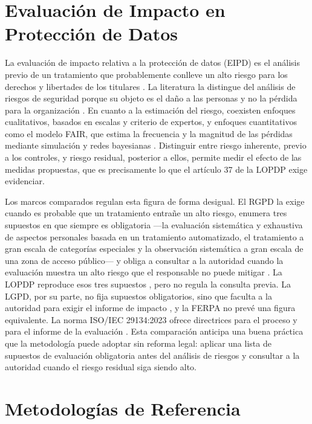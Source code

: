 \section{Evaluación de Impacto en Protección de Datos}
\label{sec:eipd}

La evaluación de impacto relativa a la protección de datos (EIPD) es el análisis previo de un tratamiento que probablemente conlleve un alto riesgo para los derechos y libertades de los titulares \cite[art.~42]{lopdp2021}. La literatura la distingue del análisis de riesgos de seguridad porque su objeto es el daño a las personas y no la pérdida para la organización \cite{wairimu2024evaluation}. En cuanto a la estimación del riesgo, coexisten enfoques cualitativos, basados en escalas y criterio de expertos, y enfoques cuantitativos como el modelo FAIR, que estima la frecuencia y la magnitud de las pérdidas mediante simulación y redes bayesianas \cite{wang2020fair}. Distinguir entre riesgo inherente, previo a los controles, y riesgo residual, posterior a ellos, permite medir el efecto de las medidas propuestas, que es precisamente lo que el artículo 37 de la LOPDP exige evidenciar.

Los marcos comparados regulan esta figura de forma desigual. El RGPD la exige cuando es probable que un tratamiento entrañe un alto riesgo, enumera tres supuestos en que siempre es obligatoria ---la evaluación sistemática y exhaustiva de aspectos personales basada en un tratamiento automatizado, el tratamiento a gran escala de categorías especiales y la observación sistemática a gran escala de una zona de acceso público--- y obliga a consultar a la autoridad cuando la evaluación muestra un alto riesgo que el responsable no puede mitigar \cite[arts.~35 y 36]{rgpd2016}. La LOPDP reproduce esos tres supuestos \cite[art.~42]{lopdp2021}, pero no regula la consulta previa. La LGPD, por su parte, no fija supuestos obligatorios, sino que faculta a la autoridad para exigir el informe de impacto \cite[art.~38]{brasil2018lgpd}, y la FERPA no prevé una figura equivalente. La norma ISO/IEC 29134:2023 ofrece directrices para el proceso y para el informe de la evaluación \cite{iso29134_2023}. Esta comparación anticipa una buena práctica que la metodología puede adoptar sin reforma legal: aplicar una lista de supuestos de evaluación obligatoria antes del análisis de riesgos y consultar a la autoridad cuando el riesgo residual siga siendo alto.

\section{Metodologías de Referencia}
\label{sec:metodologias_referencia}

